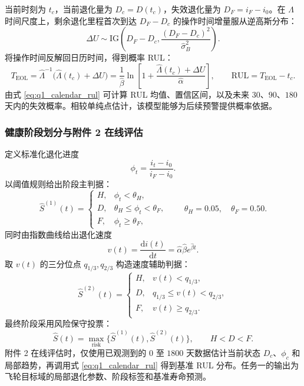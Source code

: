 当前时刻为 $t_c$，当前退化量为 $D_c=D(t_c)$，失效退化量为 $D_F=i_F-i_0$。在 $\Lambda$ 时间尺度上，剩余退化里程首次到达 $D_F-D_c$ 的操作时间增量服从逆高斯分布：
\begin{equation}
  \label{eq:q1_ig_u}
  \Delta U
  \sim
  \mathrm{IG}\left(
    D_F-D_c,
    \frac{(D_F-D_c)^2}{\hat\sigma_B^2}
  \right).
\end{equation}
将操作时间反解回日历时间，得到概率 RUL：
\begin{equation}
  \label{eq:q1_calendar_rul}
  T_{\mathrm{EOL}}
  =
  \hat\Lambda^{-1}\bigl(\hat\Lambda(t_c)+\Delta U\bigr)
  =
  \frac{1}{\hat\beta}
  \ln\left[
    1+\frac{\hat\Lambda(t_c)+\Delta U}{\hat\alpha}
  \right],
  \qquad
  \mathrm{RUL}=T_{\mathrm{EOL}}-t_c .
\end{equation}
由式 \eqref{eq:q1_calendar_rul} 可计算 RUL 均值、置信区间，以及未来 $30$、$90$、$180$ 天内的失效概率。相较单纯点估计，该模型能够为后续预警提供概率依据。

\subsubsection{健康阶段划分与附件 2 在线评估}

定义标准化退化进度
\begin{equation}
  \label{eq:q1_phi}
  \phi_t=\frac{i_t-i_0}{i_F-i_0}.
\end{equation}
以阈值规则给出阶段主判据：
\begin{equation}
  \label{eq:q1_stage_threshold}
  \hat S^{(1)}(t)=
  \begin{cases}
  H, & \phi_t<\theta_H,\\
  D, & \theta_H\le\phi_t<\theta_F,\\
  F, & \phi_t\ge\theta_F,
  \end{cases}
  \qquad
  \theta_H=0.05,\quad \theta_F=0.50.
\end{equation}
同时由指数曲线给出退化速度
\begin{equation}
  \label{eq:q1_velocity}
  v(t)=\frac{\mathrm d i(t)}{\mathrm d t}
  =
  \hat\alpha\hat\beta e^{\hat\beta t}.
\end{equation}
取 $v(t)$ 的三分位点 $q_{1/3},q_{2/3}$ 构造速度辅助判据：
\begin{equation}
  \label{eq:q1_stage_velocity}
  \hat S^{(2)}(t)=
  \begin{cases}
  H, & v(t)<q_{1/3},\\
  D, & q_{1/3}\le v(t)<q_{2/3},\\
  F, & v(t)\ge q_{2/3}.
  \end{cases}
\end{equation}
最终阶段采用风险保守投票：
\begin{equation}
  \label{eq:q1_stage_vote}
  \hat S(t)=
  \max_{\mathrm{risk}}\{\hat S^{(1)}(t),\hat S^{(2)}(t)\},
  \qquad H<D<F.
\end{equation}
附件 2 在线评估时，仅使用已观测到的 $0$ 至 $1800$ 天数据估计当前状态 $D_c$、$\phi_c$ 和局部趋势，再调用式 \eqref{eq:q1_calendar_rul} 得到基准 RUL 分布。任务一的输出为飞轮目标域的局部退化参数、阶段标签和基准寿命预测。

